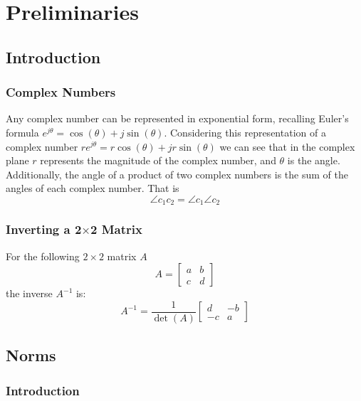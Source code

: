\chapter{Preliminaries}

\section{Introduction}

\subsection{Complex Numbers}

Any complex number can be represented in exponential form, recalling Euler's formula $e^{j\theta}=\cos(\theta)+j\sin(\theta)$.
Considering this representation of a complex number $re^{j\theta}=r\cos(\theta)+jr\sin(\theta)$ we can see that in the complex plane $r$ represents the magnitude of the complex number, and $\theta$ is the angle.
Additionally, the angle of a product of two complex numbers is the sum of the angles of each complex number.
That is
\begin{equation*}
  \angle c_{1}c_{2}=\angle c_{1}\angle c_{2}
\end{equation*}

\subsection{Inverting a 2\texorpdfstring{$\times$}{x}2 Matrix}

For the following $2\times 2$ matrix $A$
\begin{equation*}
  A=\begin{bmatrix} a & b \\ c & d \end{bmatrix}
\end{equation*}
the inverse $A^{-1}$ is:
\begin{equation*}
  A^{-1}=\frac{1}{\det(A)}\begin{bmatrix} d & -b \\ -c & a \end{bmatrix}
\end{equation*}

\section{Norms}

\subsection{Introduction}


